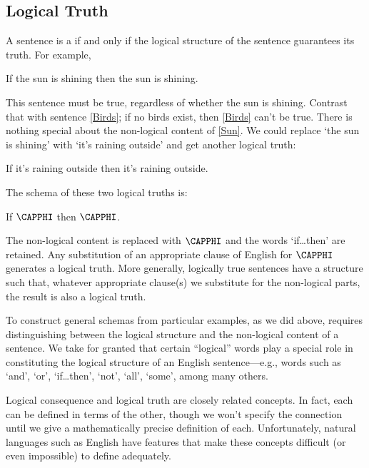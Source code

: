 \subsection{Logical Truth}\label{Logical Truth}

A sentence is a  if and only if the logical structure of the sentence guarantees its truth.  For example,
\begin{menumerate}
	\item\label{Sun} If the sun is shining then the sun is shining.
\end{menumerate}
This sentence must be true, regardless of whether the sun is shining. Contrast that with sentence \ref{Birds}; if no birds exist, then \ref{Birds} can't be true.  There is nothing special about the non-logical content of \ref{Sun}.  We could replace `the sun is shining' with `it's raining outside' and get another logical truth:
\begin{menumerate}
	\item If it's raining outside then it's raining outside.
\end{menumerate}
The schema of these two logical truths is:
\begin{menumerate}
	\item If $\CAPPHI$ then $\CAPPHI$.
\end{menumerate}
The non-logical content is replaced with $\CAPPHI$ and the words `if\dots then' are retained. Any substitution of an appropriate clause of English for $\CAPPHI$ generates a logical truth.
More generally, logically true sentences have a structure such that, whatever appropriate clause(s) we substitute for the non-logical parts, the result is also a logical truth. 

To construct general schemas from particular examples, as we did above, requires distinguishing between the logical structure and the non-logical content of a sentence. 
We take for granted that certain ``logical'' words play a special role in constituting the logical structure of an English sentence---e.g., words such as `and', `or', `if\ldots  then', `not', `all', `some', among many others.

Logical consequence and logical truth are closely related concepts. In fact, each can be defined in terms of the other, though we won't specify the connection until we give a mathematically precise definition of each. Unfortunately, natural languages such as English have features that make these concepts difficult (or even impossible) to define adequately. 

